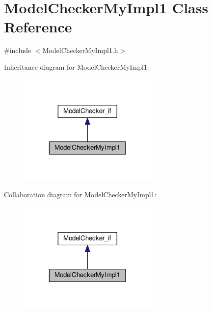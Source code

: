 \hypertarget{class_model_checker_my_impl1}{\section{Model\-Checker\-My\-Impl1 Class Reference}
\label{class_model_checker_my_impl1}
}


{\ttfamily \#include $<$Model\-Checker\-My\-Impl1.\-h$>$}



Inheritance diagram for Model\-Checker\-My\-Impl1\-:
\nopagebreak
\begin{figure}[H]
\begin{center}
\leavevmode
\includegraphics[width=196pt]{class_model_checker_my_impl1__inherit__graph}
\end{center}
\end{figure}


Collaboration diagram for Model\-Checker\-My\-Impl1\-:
\nopagebreak
\begin{figure}[H]
\begin{center}
\leavevmode
\includegraphics[width=196pt]{class_model_checker_my_impl1__coll__graph}
\end{center}
\end{figure}
